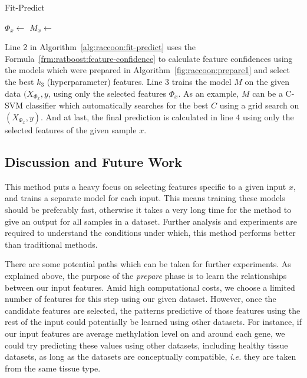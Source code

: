 \begin{algorithm}
\caption{Fit-Predict}
\label{alg:raccoon:fit-predict}
\begin{algorithmic}[1]
    \State $\Phi_x \gets $ 
    \State $M_x \gets $ 
    \State \Return {}
\EndFunction
\end{algorithmic}
\end{algorithm}

Line 2 in Algorithm~\ref{alg:raccoon:fit-predict} uses the Formula~\ref{frm:ratboost:feature-confidence} to calculate feature confidences using the models which were prepared in Algorithm~\ref{fig:raccoon:prepare1} and select the best $k_3$ (hyperparameter) features. Line 3 trains the model $M$ on the given data $(X_{\Phi_x}, y$, using only the selected features $\Phi_x$. As an example, $M$ can be a C-SVM classifier which automatically searches for the best $C$ using a grid search on $(X_{\Phi_x}, y)$. And at last, the final prediction is calculated in line 4 using only the selected features of the given sample $x$.

\subsection{Discussion and Future Work}
This method puts a heavy focus on selecting features specific to a given input $x$, and trains a separate model for each input. This means training these models should be preferably fast, otherwise it takes a very long time for the method to give an output for all samples in a dataset. Further analysis and experiments are required to understand the conditions under which, this method performs better than traditional methods.

There are some potential paths which can be taken for further experiments. As explained above, the purpose of the \emph{prepare} phase is to learn the relationships between our input features. Amid high computational costs, we choose a limited number of features for this step using our given dataset. However, once the candidate features are selected, the patterns predictive of those features using the rest of the input could potentially be learned using other datasets. For instance, if our input features are average methylation level on and around each gene, we could try predicting these values using other datasets, including healthy tissue datasets, as long as the datasets are conceptually compatible, \emph{i.e.} they are taken from the same tissue type.

